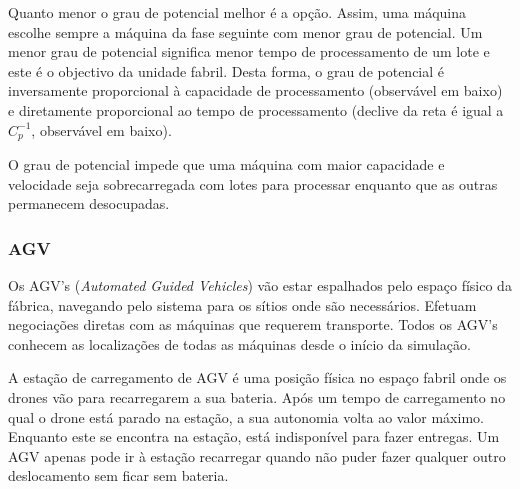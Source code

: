 \begin{titlepage}
Quanto menor o grau de potencial melhor é a opção. Assim, uma máquina escolhe sempre a máquina da fase seguinte com menor grau de potencial. Um menor grau de potencial significa menor tempo de processamento de um lote e este é o objectivo da unidade fabril. Desta forma, o grau de potencial é inversamente proporcional à capacidade de processamento (observável em baixo) e diretamente proporcional ao tempo de processamento (declive da reta é igual a $C_{p}^{-1}$, observável em baixo).


  
  O grau de potencial impede que uma máquina com maior capacidade e velocidade seja sobrecarregada com lotes para processar enquanto que as outras permanecem desocupadas.

\subsubsection{AGV}

Os AGV's (\textit{Automated Guided Vehicles}) vão estar espalhados pelo espaço físico da fábrica, navegando pelo sistema para os sítios onde são necessários. Efetuam negociações diretas com as máquinas que requerem transporte. Todos os AGV's conhecem as localizações de todas as máquinas desde o início da simulação.\newline

A estação de carregamento de AGV é uma posição física no espaço fabril onde os drones vão para recarregarem a sua bateria. Após um tempo de carregamento no qual o drone está parado na estação, a sua autonomia volta ao valor máximo. Enquanto este se encontra na estação, está indisponível para fazer entregas. Um AGV apenas pode ir à estação recarregar quando não puder fazer qualquer outro deslocamento sem ficar sem bateria.\newline


\end{titlepage}
